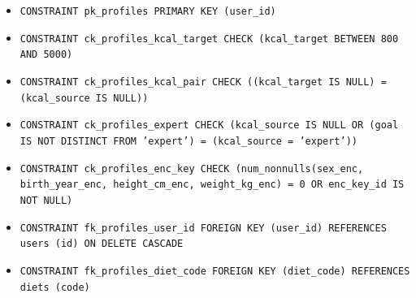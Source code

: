 \begin{itemize}
\item \raggedright {\small\texttt{CONSTRAINT pk\_\allowbreak{}\allowbreak{}profiles PRIMARY KEY (user\_\allowbreak{}\allowbreak{}id)}}
\item \raggedright {\small\texttt{CONSTRAINT ck\_\allowbreak{}\allowbreak{}profiles\_\allowbreak{}\allowbreak{}kcal\_\allowbreak{}\allowbreak{}target CHECK (kcal\_\allowbreak{}\allowbreak{}target BETWEEN 800 AND 5000)}}
\item \raggedright {\small\texttt{CONSTRAINT ck\_\allowbreak{}\allowbreak{}profiles\_\allowbreak{}\allowbreak{}kcal\_\allowbreak{}\allowbreak{}pair CHECK ((kcal\_\allowbreak{}\allowbreak{}target IS NULL) = (kcal\_\allowbreak{}\allowbreak{}source IS NULL))}}
\item \raggedright {\small\texttt{CONSTRAINT ck\_\allowbreak{}\allowbreak{}profiles\_\allowbreak{}\allowbreak{}expert CHECK (kcal\_\allowbreak{}\allowbreak{}source IS NULL OR (goal IS NOT DISTINCT FROM 'expert') = (kcal\_\allowbreak{}\allowbreak{}source = 'expert'))}}
\item \raggedright {\small\texttt{CONSTRAINT ck\_\allowbreak{}\allowbreak{}profiles\_\allowbreak{}\allowbreak{}enc\_\allowbreak{}\allowbreak{}key CHECK (num\_\allowbreak{}\allowbreak{}nonnulls(sex\_\allowbreak{}\allowbreak{}enc, birth\_\allowbreak{}\allowbreak{}year\_\allowbreak{}\allowbreak{}enc, height\_\allowbreak{}\allowbreak{}cm\_\allowbreak{}\allowbreak{}enc, weight\_\allowbreak{}\allowbreak{}kg\_\allowbreak{}\allowbreak{}enc) = 0 OR enc\_\allowbreak{}\allowbreak{}key\_\allowbreak{}\allowbreak{}id IS NOT NULL)}}
\item \raggedright {\small\texttt{CONSTRAINT fk\_\allowbreak{}\allowbreak{}profiles\_\allowbreak{}\allowbreak{}user\_\allowbreak{}\allowbreak{}id FOREIGN KEY (user\_\allowbreak{}\allowbreak{}id) REFERENCES users (id) ON DELETE CASCADE}}
\item \raggedright {\small\texttt{CONSTRAINT fk\_\allowbreak{}\allowbreak{}profiles\_\allowbreak{}\allowbreak{}diet\_\allowbreak{}\allowbreak{}code FOREIGN KEY (diet\_\allowbreak{}\allowbreak{}code) REFERENCES diets (code)}}
\end{itemize}

